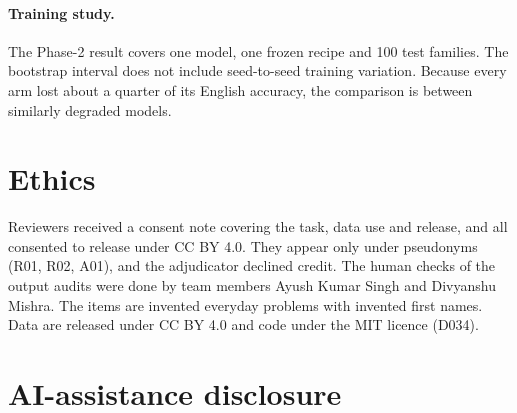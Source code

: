 \documentclass[12pt,a4paper,oneside]{report}
\renewcommand{\_}{\oldunderscore\allowbreak}
\begin{document}
\paragraph{Training study.} The Phase-2 result covers one model, one frozen recipe and 100 test families. The bootstrap interval does not include seed-to-seed training variation. Because every arm lost about a quarter of its English accuracy, the comparison is between similarly degraded models.

\section{Ethics}

Reviewers received a consent note covering the task, data use and release, and all consented to release under CC BY 4.0. They appear only under pseudonyms (R01, R02, A01), and the adjudicator declined credit. The human checks of the output audits were done by team members Ayush Kumar Singh and Divyanshu Mishra. The items are invented everyday problems with invented first names. Data are released under CC BY 4.0 and code under the MIT licence (D034).

\section{AI-assistance disclosure}
\label{sec:aidisclosure}
\end{document}
